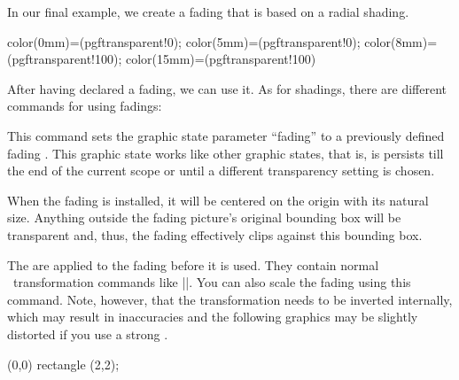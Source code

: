 \begin{command}{\pgfdeclarefading{}}
    In our final example, we create a fading that is based on a radial shading.
\begin{codeexample}[]
{
  color(0mm)=(pgftransparent!0);
  color(5mm)=(pgftransparent!0);
  color(8mm)=(pgftransparent!100);
  color(15mm)=(pgftransparent!100)
}
\end{codeexample}
\end{command}

After having declared a fading, we can use it. As for shadings, there are
different commands for using fadings:

\begin{command}{\pgfsetfading{}}
    This command sets the graphic state parameter ``fading'' to a previously
    defined fading . This graphic state works like other graphic
    states, that is, is persists till the end of the current scope or until a
    different transparency setting is chosen.

    When the fading is installed, it will be centered on the origin with its
    natural size. Anything outside the fading picture's original bounding box
    will be transparent and, thus, the fading effectively clips against this
    bounding box.

    The  are applied to the fading before it is used.
    They contain normal \pgfname\ transformation commands like
    |\pgftransformshift|. You can also scale the fading using this command.
    Note, however, that the transformation needs to be inverted internally,
    which may result in inaccuracies and the following graphics may be slightly
    distorted if you use a strong .
\begin{codeexample}[]
{\tikz \shade[left color=pgftransparent!0,
              right color=pgftransparent!100] (0,0) rectangle (2,2);}
\end{codeexample}
\begin{codeexample}[]
\end{codeexample}
\end{command}

